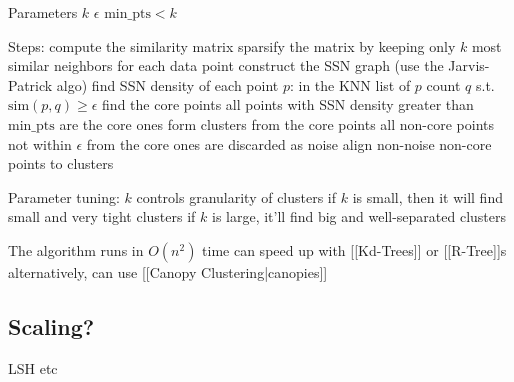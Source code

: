 Parameters
 $k$
 $\epsilon$
 $\text{min\_pts} < k$


Steps:
 compute the similarity matrix
 sparsify the matrix by keeping only $k$ most similar neighbors for each data point
 construct the SSN graph (use the Jarvis-Patrick algo)
 find SSN density of each point $p$:
 in the KNN list of $p$ count $q$ s.t. $\text{sim}(p, q) \geqslant \epsilon$
 find the core points
 all points with SSN density greater than $\text{min\_pts}$ are the core ones
 form clusters from the core points
 all non-core points not within $\epsilon$ from the core ones are discarded as noise
 align non-noise non-core points to clusters


Parameter tuning:
 $k$ controls granularity of clusters
 if $k$ is small, then it will find small and very tight clusters
 if $k$ is large, it'll find big and well-separated clusters


 The algorithm runs in $O(n^2)$ time
 can speed up with [[Kd-Trees]] or [[R-Tree]]s
 alternatively, can use [[Canopy Clustering|canopies]]


\subsection{Scaling?}

LSH etc
